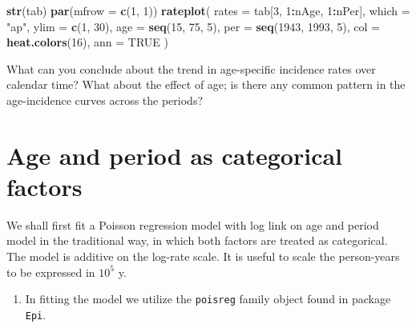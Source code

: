 \documentclass[
]{book}
\newenvironment{Shaded}{\begin{snugshade}}{\end{snugshade}}
\newcommand{\AttributeTok}[1]{\textcolor[rgb]{0.13,0.29,0.53}{#1}}
\newcommand{\ConstantTok}[1]{\textcolor[rgb]{0.56,0.35,0.01}{#1}}
\newcommand{\DecValTok}[1]{\textcolor[rgb]{0.00,0.00,0.81}{#1}}
\newcommand{\FunctionTok}[1]{\textcolor[rgb]{0.13,0.29,0.53}{\textbf{#1}}}
\newcommand{\NormalTok}[1]{#1}
\newcommand{\OtherTok}[1]{\textcolor[rgb]{0.56,0.35,0.01}{#1}}
\newcommand{\SpecialCharTok}[1]{\textcolor[rgb]{0.81,0.36,0.00}{\textbf{#1}}}
\newcommand{\StringTok}[1]{\textcolor[rgb]{0.31,0.60,0.02}{#1}}
\providecommand{\tightlist}{%
  \setlength{\itemsep}{0pt}\setlength{\parskip}{0pt}}
\begin{document}
\begin{Shaded}
\begin{Highlighting}[]
\FunctionTok{str}\NormalTok{(tab)}
\FunctionTok{par}\NormalTok{(}\AttributeTok{mfrow =} \FunctionTok{c}\NormalTok{(}\DecValTok{1}\NormalTok{, }\DecValTok{1}\NormalTok{))}
\FunctionTok{rateplot}\NormalTok{(}
  \AttributeTok{rates =}\NormalTok{ tab[}\DecValTok{3}\NormalTok{, }\DecValTok{1}\SpecialCharTok{:}\NormalTok{nAge, }\DecValTok{1}\SpecialCharTok{:}\NormalTok{nPer], }\AttributeTok{which =} \StringTok{"ap"}\NormalTok{, }\AttributeTok{ylim =} \FunctionTok{c}\NormalTok{(}\DecValTok{1}\NormalTok{, }\DecValTok{30}\NormalTok{),}
  \AttributeTok{age =} \FunctionTok{seq}\NormalTok{(}\DecValTok{15}\NormalTok{, }\DecValTok{75}\NormalTok{, }\DecValTok{5}\NormalTok{), }\AttributeTok{per =} \FunctionTok{seq}\NormalTok{(}\DecValTok{1943}\NormalTok{, }\DecValTok{1993}\NormalTok{, }\DecValTok{5}\NormalTok{),}
  \AttributeTok{col =} \FunctionTok{heat.colors}\NormalTok{(}\DecValTok{16}\NormalTok{), }\AttributeTok{ann =} \ConstantTok{TRUE}
\NormalTok{)}
\end{Highlighting}
\end{Shaded}

What can you conclude about the trend in age-specific incidence rates
over calendar time? What about the effect of age;
is there any common pattern in the age-incidence curves across the periods?

\section{Age and period as categorical factors}\label{age-and-period-as-categorical-factors}

We shall first fit a Poisson regression model with log link
on age and period model in the traditional way,
in which both factors are treated as categorical.
The model is additive on the log-rate scale.
It is useful to scale the person-years to be expressed in \(10^5\) y.

\begin{enumerate}
\def\labelenumi{\arabic{enumi}.}
\tightlist
\item
  In fitting the model we utilize the \texttt{poisreg} family object
  found in package \texttt{Epi}.
\end{enumerate}

\begin{Shaded}
\end{Shaded}
\end{document}
